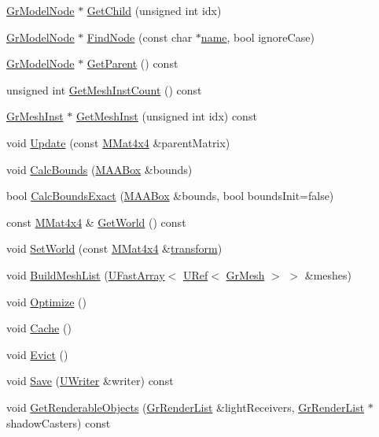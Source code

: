 \begin{CompactItemize}
\hyperlink{class_gr_model_node}{GrModelNode} $\ast$ \hyperlink{class_gr_model_node_5b6cf7fff3778f0c4411823132cb5c28}{GetChild} (unsigned int idx)
\item 
\hyperlink{class_gr_model_node}{GrModelNode} $\ast$ \hyperlink{class_gr_model_node_ea35f9469b11a8a8033f8ad1c7a54c24}{FindNode} (const char $\ast$\hyperlink{glext__bak_8h_bb62efe59ccdd153ce42e1a418352209}{name}, bool ignoreCase)
\item 
\hyperlink{class_gr_model_node}{GrModelNode} $\ast$ \hyperlink{class_gr_model_node_e203953dfdbddbb5cf35859187a2e749}{GetParent} () const 
\item 
unsigned int \hyperlink{class_gr_model_node_34fb55f7a4af15a5d6f241117f62012f}{GetMeshInstCount} () const 
\item 
\hyperlink{class_gr_mesh_inst}{GrMeshInst} $\ast$ \hyperlink{class_gr_model_node_f5340d3bc303ba7f9211f89e791b013d}{GetMeshInst} (unsigned int idx) const 
\item 
void \hyperlink{class_gr_model_node_c5c58f7cd659b01c66e0f45054cd6200}{Update} (const \hyperlink{class_m_mat4x4}{MMat4x4} \&parentMatrix)
\item 
void \hyperlink{class_gr_model_node_91040763448f20348673c730e8e6fbf8}{CalcBounds} (\hyperlink{class_m_a_a_box}{MAABox} \&bounds)
\item 
bool \hyperlink{class_gr_model_node_3bc9a825d5c12c5f8484a869e992ac0f}{CalcBoundsExact} (\hyperlink{class_m_a_a_box}{MAABox} \&bounds, bool boundsInit=false)
\item 
const \hyperlink{class_m_mat4x4}{MMat4x4} \& \hyperlink{class_gr_model_node_2799107e185b3fb30a4429b1bb0cf1f9}{GetWorld} () const 
\item 
void \hyperlink{class_gr_model_node_65acb56567cf1c21de6124a9e3ef0b71}{SetWorld} (const \hyperlink{class_m_mat4x4}{MMat4x4} \&\hyperlink{glext__bak_8h_07993c0d92c1aeeb357ba0495c8b5325}{transform})
\item 
void \hyperlink{class_gr_model_node_2c131ad23d4aa9b499340a803690e3d0}{BuildMeshList} (\hyperlink{class_u_fast_array}{UFastArray}$<$ \hyperlink{class_u_ref}{URef}$<$ \hyperlink{class_gr_mesh}{GrMesh} $>$ $>$ \&meshes)
\item 
void \hyperlink{class_gr_model_node_6dd727604b84d6463b1ba282d0702b4a}{Optimize} ()
\item 
void \hyperlink{class_gr_model_node_8dfebc45736fa221d3988d7bc05f71bf}{Cache} ()
\item 
void \hyperlink{class_gr_model_node_598ada3ae0f7b3028d0b9f3cff6c1edd}{Evict} ()
\item 
void \hyperlink{class_gr_model_node_5232522d893c1b123115f95a6e1b1a7a}{Save} (\hyperlink{class_u_writer}{UWriter} \&writer) const 
\item 
void \hyperlink{class_gr_model_node_ad9c0636157e8cad390826cf91e16780}{GetRenderableObjects} (\hyperlink{class_gr_render_list}{GrRenderList} \&lightReceivers, \hyperlink{class_gr_render_list}{GrRenderList} $\ast$shadowCasters) const 
\end{CompactItemize}


